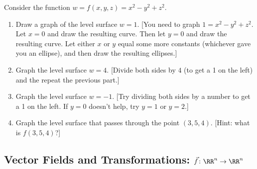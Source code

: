 \begin{problem}
%

Consider the function $w=f(x,y,z)=x^2-y^2+z^2$.
 \begin{enumerate}
  \item Draw a graph of the level surface $w=1$. [You need to graph $1=x^2-y^2+z^2$. Let $x=0$ and draw the resulting curve. Then let $y=0$ and draw the resulting curve. Let either $x$ or $y$ equal some more constants (whichever gave you an ellipse), and then draw the resulting ellipses.]  
  \item Graph the level surface $w=4$. [Divide both sides by $4$ (to get a 1 on the left) and the repeat the previous part.]
  \item Graph the level surface $w=-1$. [Try dividing both sides by a number to get a 1 on the left. If $y=0$ doesn't help, try $y=1$ or $y=2$.]
  \item Graph the level surface that passes through the point $(3,5,4)$. [Hint: what is $f(3,5,4)$?]
 \end{enumerate}
\end{problem}


\subsection{Vector Fields and Transformations: $\vec f\colon \RR^n\to\RR^n$}

